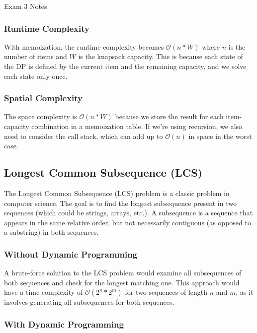 \begin{examnotes}{Exam 3 Notes}
\begin{highlight}
        \subsubsection*{Runtime Complexity}

        With memoization, the runtime complexity becomes $\mathcal{O}(n*W)$ where $n$ is the number of items and $W$ is the knapsack capacity. This is because each state of the DP is defined by the 
        current item and the remaining capacity, and we solve each state only once. \vspace*{1em}

        \subsubsection*{Spatial Complexity}

        The space complexity is $\mathcal{O}(n*W)$ because we store the result for each item-capacity combination in a memoization table. If we're using recursion, we also need to consider the call 
        stack, which can add up to $\mathcal{O}(n)$ in space in the worst case.
    \end{highlight}

    \subsection*{Longest Common Subsequence (LCS)}

    The Longest Common Subsequence (LCS) problem is a classic problem in computer science. The goal is to find the longest subsequence present in two sequences (which could be strings, arrays, etc.). 
    A subsequence is a sequence that appears in the same relative order, but not necessarily contiguous (as opposed to a substring) in both sequences.

    \subsubsection*{Without Dynamic Programming}

    A brute-force solution to the LCS problem would examine all subsequences of both sequences and check for the longest matching one. This approach would have a time complexity of $\mathcal{O}(2^n * 2^m)$ 
    for two sequences of length $n$ and $m$, as it involves generating all subsequences for both sequences.

    \subsubsection*{With Dynamic Programming}


\end{examnotes}
